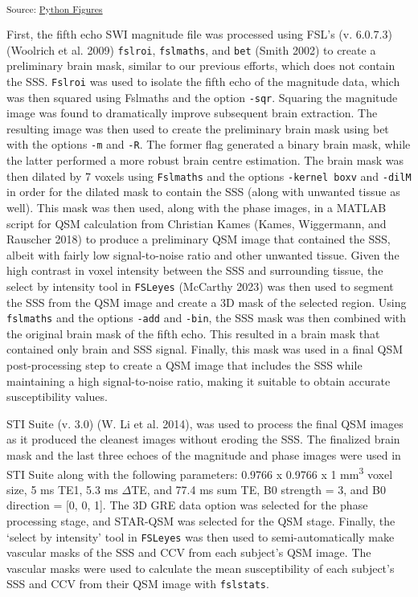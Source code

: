 \documentclass[
sn-nature
]{sn-jnl}
\begin{document}
\textsubscript{Source:
\href{https://WeberLab.github.io/Chisep_CSVO2_Manuscript/notebooks/Figures-preview.html\#cell-fig-graph}{Python
Figures}}

First, the fifth echo SWI magnitude file was processed using FSL's (v.
6.0.7.3) (Woolrich et al. 2009) \texttt{fslroi}, \texttt{fslmaths}, and
\texttt{bet} (Smith 2002) to create a preliminary brain mask, similar to
our previous efforts, which does not contain the SSS. \texttt{Fslroi}
was used to isolate the fifth echo of the magnitude data, which was then
squared using Fslmaths and the option \texttt{-sqr}. Squaring the
magnitude image was found to dramatically improve subsequent brain
extraction. The resulting image was then used to create the preliminary
brain mask using bet with the options \texttt{-m} and \texttt{-R}. The
former flag generated a binary brain mask, while the latter performed a
more robust brain centre estimation. The brain mask was then dilated by
7 voxels using \texttt{Fslmaths} and the options \texttt{-kernel\ boxv}
and \texttt{-dilM} in order for the dilated mask to contain the SSS
(along with unwanted tissue as well). This mask was then used, along
with the phase images, in a MATLAB script for QSM calculation from
Christian Kames (Kames, Wiggermann, and Rauscher 2018) to produce a
preliminary QSM image that contained the SSS, albeit with fairly low
signal-to-noise ratio and other unwanted tissue. Given the high contrast
in voxel intensity between the SSS and surrounding tissue, the select by
intensity tool in \texttt{FSLeyes} (McCarthy 2023) was then used to
segment the SSS from the QSM image and create a 3D mask of the selected
region. Using \texttt{fslmaths} and the options \texttt{-add} and
\texttt{-bin}, the SSS mask was then combined with the original brain
mask of the fifth echo. This resulted in a brain mask that contained
only brain and SSS signal. Finally, this mask was used in a final QSM
post-processing step to create a QSM image that includes the SSS while
maintaining a high signal-to-noise ratio, making it suitable to obtain
accurate susceptibility values.

STI Suite (v. 3.0) (W. Li et al. 2014), was used to process the final
QSM images as it produced the cleanest images without eroding the SSS.
The finalized brain mask and the last three echoes of the magnitude and
phase images were used in STI Suite along with the following parameters:
0.9766 x 0.9766 x 1 mm\textsuperscript{3} voxel size, 5 ms TE1, 5.3 ms
\(\Delta\)TE, and 77.4 ms sum TE, B0 strength = 3, and B0 direction =
{[}0, 0, 1{]}. The 3D GRE data option was selected for the phase
processing stage, and STAR-QSM was selected for the QSM stage. Finally,
the `select by intensity' tool in \texttt{FSLeyes} was then used to
semi-automatically make vascular masks of the SSS and CCV from each
subject's QSM image. The vascular masks were used to calculate the mean
susceptibility of each subject's SSS and CCV from their QSM image with
\texttt{fslstats}.
\end{document}
